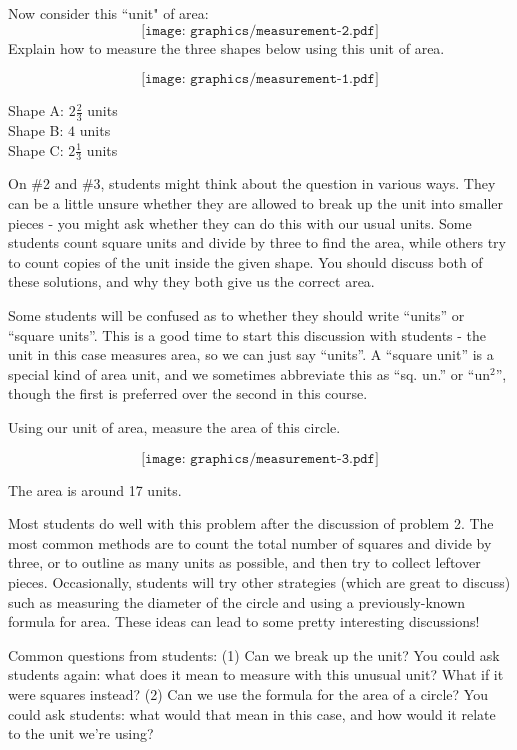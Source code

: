 \documentclass[handout]{ximera}
\begin{document}
\begin{problem}
Now consider this ``unit" of area:
 \[
\texttt{[image: graphics/measurement-2.pdf]}
\]
Explain how to measure the three shapes below using this unit of area.

\[
\texttt{[image: graphics/measurement-1.pdf]}
\]

\begin{solution}
    Shape A: $2 \frac{2}{3}$ units\\
    Shape B: $4$ units\\
    Shape C: $2 \frac{1}{3}$ units
\end{solution}

\begin{instructorNotes}
    On \#2 and \#3, students might think about the question in various ways.  They can be a little unsure whether they are allowed to break up the unit into smaller pieces - you might ask whether they can do this with our usual units.  Some students count square units and divide by three to find the area, while others try to count copies of the unit inside the given shape.  You should discuss both of these solutions, and why they both give us the correct area.
    
    Some students will be confused as to whether they should write ``units'' or ``square units''.  This is a good time to start this discussion with students - the unit in this case measures area, so we can just say ``units''.  A ``square unit'' is a special kind of area unit, and we sometimes abbreviate this as ``sq. un.'' or ``un$^2$'', though the first is preferred over the second in this course.
\end{instructorNotes}
\end{problem}

\begin{problem}
Using our unit of area, measure the area of this circle.

\[
\texttt{[image: graphics/measurement-3.pdf]}
\]

\begin{solution}
    The area is around 17 units.
\end{solution}

\begin{instructorNotes}
    Most students do well with this problem after the discussion of problem 2.  The most common methods are to count the total number of squares and divide by three, or to outline as many units as possible, and then try to collect leftover pieces.  Occasionally, students will try other strategies (which are great to discuss) such as measuring the diameter of the circle and using a previously-known formula for area.  These ideas can lead to some pretty interesting discussions!
    
    Common questions from students: (1) Can we break up the unit?  You could ask students again: what does it mean to measure with this unusual unit?  What if it were squares instead? (2) Can we use the formula for the area of a circle?  You could ask students: what would that mean in this case, and how would it relate to the unit we're using?
\end{instructorNotes}

\end{problem}
\end{document}
